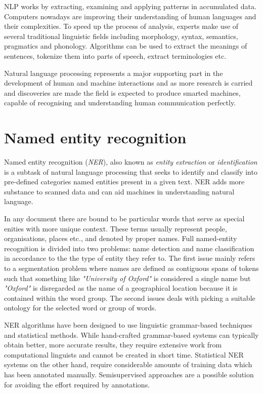 \documentclass{report}
\begin{document}
NLP works by extracting, examining and applying patterns in accumulated data. Computers nowadays are improving their understanding of human languages and their complexities. To speed up the process of analysis, experts make use of several traditional linguistic fields including morphology, syntax, semantics, pragmatics and phonology. Algorithms can be used to extract the meanings of sentences, tokenize them into parts of speech, extract terminologies etc. \par

Natural language processing represents a major supporting part in the development of human and machine interactions and as more research is carried and discoveries are made the field is expected to produce smarted machines, capable of recognising and understanding human communication perfectly.

\section{Named entity recognition}
Named entity recognition (\textit{NER}), also known as \textit{entity extraction} or \textit{identification} is a subtask of natural language processing that seeks to identify and classify into pre-defined categories named entities present in a given text. NER adds more substance to scanned data and can aid machines in understanding natural language. \par

In any document there are bound to be particular words that serve as special enities with more unique context. These terms usually represent people, organisations, places etc., and denoted by proper names. Full named-entity recognition is divided into two problems: name detection and name classification in accordance to the the type of entity they refer to. The first issue mainly refers to a segmentation problem where names are defined as contiguous spans of tokens such that something like \textit{"University of Oxford"} is considered a single name but \textit{"Oxford"} is disregarded as the name of a geographical location because it is contained within the word group. The second issues deals with picking a suitable ontology for the selected word or group of words. \par

NER algorithms have been designed to use linguistic grammar-based techniques and statistical methods. While hand-crafted grammar-based systems can typically obtain better, more accurate results, they require extensive work from computational linguists and cannot be created in short time. Statistical NER systems on the other hand, require considerable amounts of training data which has been annotated manually. Semisupervised approaches are a possible solution for avoiding the effort required by annotations. \par
\end{document}
